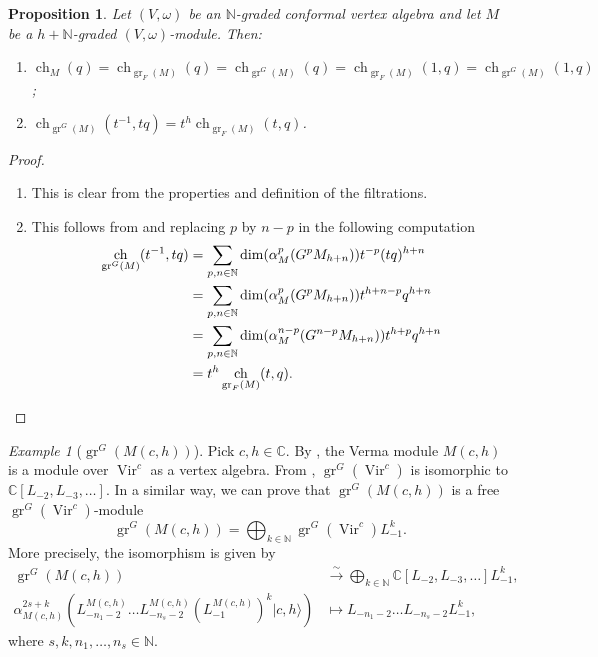 \documentclass[a4paper, 12pt, reqno]{amsart}
\newtheorem{proposition}[theorem]{Proposition}
\theoremstyle{remark}
\newtheorem{example}[theorem]{Example}
\numberwithin{equation}{subsection}
\DeclareMathOperator{\Vir}{Vir}
\DeclareMathOperator{\gr}{gr}
\DeclareMathOperator{\ch}{ch}
\begin{document}
\begin{proposition}
  \label{prp:15}
  Let $(V, \omega)$ be an $\mathbb{N}$-graded conformal vertex algebra and let $M$ be a $h + \mathbb{N}$-graded $(V, \omega)$-module.
  Then:
  \begin{enumerate}
  \item $\ch_M(q) = \ch_{\gr_F(M)}(q) = \ch_{\gr^G(M)}(q) = \ch_{\gr_F(M)}(1, q) = \ch_{\gr^G(M)}(1, q)$;
  \item $\ch_{\gr^G(M)}(t^{-1}, tq) = t^h\ch_{\gr_F(M)}(t, q)$.
  \end{enumerate}
\end{proposition}

\begin{proof}\leavevmode
  \begin{enumerate}
  \item This is clear from the properties and definition of the filtrations.
  \item This follows from  and replacing $p$ by $n - p$ in the following computation
    \begin{align*}
    \ch_{\gr^G(M)}(t^{-1}, tq) &= \sum_{p, n \in \mathbb{N}}\dim(\alpha^p_M(G^pM_{h + n}))t^{-p}(tq)^{h + n} \\
    &= \sum_{p, n \in \mathbb{N}}\dim(\alpha^p_M(G^pM_{h + n}))t^{h + n - p}q^{h + n} \\
    &= \sum_{p, n \in \mathbb{N}}\dim(\alpha^{n - p}_M(G^{n - p}M_{h + n}))t^{h + p}q^{h + n} \\
    &= t^h\ch_{\gr_F(M)}(t, q). \qedhere
    \end{align*}
  \end{enumerate}
\end{proof}

\begin{example}[$\gr^G(M(c, h))$]
  \label{exa:13}
  Pick $c, h \in \mathbb{C}$.
  By , the Verma module $M(c, h)$ is a module over $\Vir^c$ as a vertex algebra.
  From , $\gr^G(\Vir^c)$ is isomorphic to $\mathbb{C}[L_{-2}, L_{-3}, \dots]$.
  In a similar way, we can prove that $\gr^G(M(c, h))$ is a free $\gr^G(\Vir^c)$-module
  \begin{equation*}
    \gr^G(M(c, h)) = \bigoplus_{k \in \mathbb{N}}\gr^G(\Vir^c)L_{-1}^k.
  \end{equation*}
  More precisely, the isomorphism is given by
  \begin{align*}
    \gr^G(M(c, h)) &\xrightarrow{\sim} \bigoplus_{k \in \mathbb{N}}\mathbb{C}[L_{-2}, L_{-3}, \dots]L_{-1}^k, \\
    \alpha_{M(c, h)}^{2s + k}(L_{-n_1 - 2}^{M(c, h)}\dots L_{-n_s - 2}^{M(c, h)}(L_{-1}^{M(c, h)})^k|c, h\rangle) &\mapsto L_{-n_1 - 2}\dots L_{-n_s - 2}L_{-1}^k,
  \end{align*}
  where $s, k, n_1, \dots, n_s \in \mathbb{N}$.
\end{example}
\end{document}
